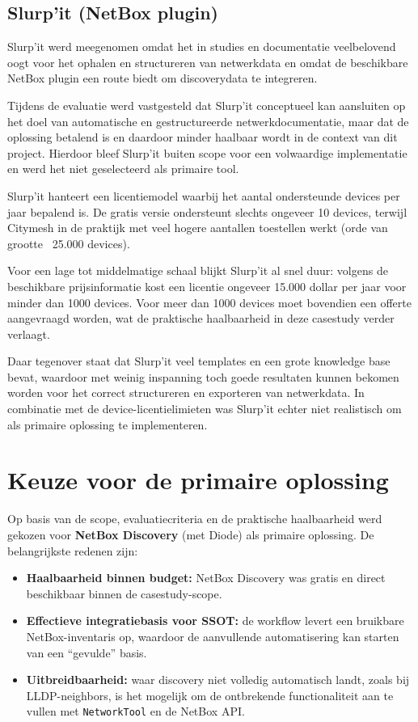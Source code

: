\subsection{Slurp'it (NetBox plugin)}

Slurp'it werd meegenomen omdat het in studies en documentatie veelbelovend oogt voor het ophalen en structureren van netwerkdata en omdat de beschikbare NetBox plugin een route biedt om discoverydata te integreren.

Tijdens de evaluatie werd vastgesteld dat Slurp'it conceptueel kan aansluiten op het doel van automatische en gestructureerde netwerkdocumentatie, maar dat de oplossing betalend is en daardoor minder haalbaar wordt in de context van dit project. Hierdoor bleef Slurp'it buiten scope voor een volwaardige implementatie en werd het niet geselecteerd als primaire tool.

Slurp'it hanteert een licentiemodel waarbij het aantal ondersteunde devices per jaar bepalend is. De gratis versie ondersteunt slechts ongeveer 10 devices, terwijl Citymesh in de praktijk met veel hogere aantallen toestellen werkt (orde van grootte ~25.000 devices).

Voor een lage tot middelmatige schaal blijkt Slurp'it al snel duur: volgens de beschikbare prijsinformatie kost een licentie ongeveer 15.000 dollar per jaar voor minder dan 1000 devices. Voor meer dan 1000 devices moet bovendien een offerte aangevraagd worden, wat de praktische haalbaarheid in deze casestudy verder verlaagt.

Daar tegenover staat dat Slurp'it veel templates en een grote knowledge base bevat, waardoor met weinig inspanning toch goede resultaten kunnen bekomen worden voor het correct structureren en exporteren van netwerkdata. In combinatie met de device-licentielimieten was Slurp'it echter niet realistisch om als primaire oplossing te implementeren.

\section{Keuze voor de primaire oplossing}

Op basis van de scope, evaluatiecriteria en de praktische haalbaarheid werd gekozen voor \textbf{NetBox Discovery} (met Diode) als primaire oplossing. De belangrijkste redenen zijn:

\begin{itemize}
  \item \textbf{Haalbaarheid binnen budget:} NetBox Discovery was gratis en direct beschikbaar binnen de casestudy-scope.
  \item \textbf{Effectieve integratiebasis voor SSOT:} de workflow levert een bruikbare NetBox-inventaris op, waardoor de aanvullende automatisering kan starten van een “gevulde” basis.
  \item \textbf{Uitbreidbaarheid:} waar discovery niet volledig automatisch landt, zoals bij LLDP-neighbors, is het mogelijk om de ontbrekende functionaliteit aan te vullen met \texttt{NetworkTool} en de NetBox API.
\end{itemize}

